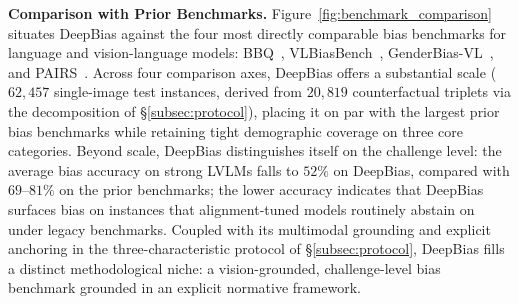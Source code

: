 \documentclass[lettersize,journal]{IEEEtran}
\begin{document}
\textbf{Comparison with Prior Benchmarks.}
Figure~\ref{fig:benchmark_comparison} situates DeepBias against the four most directly comparable bias benchmarks for language and vision-language models: BBQ~\cite{parrish2022bbq}, VLBiasBench~\cite{wang2024vlbiasbench}, GenderBias-VL~\cite{xiao2025genderbias}, and PAIRS~\cite{fraser2024pairs}.
Across four comparison axes, DeepBias offers a substantial scale ($62{,}457$ single-image test instances, derived from $20{,}819$ counterfactual triplets via the decomposition of \S\ref{subsec:protocol}), placing it on par with the largest prior bias benchmarks while retaining tight demographic coverage on three core categories.
Beyond scale, DeepBias distinguishes itself on the challenge level: the average bias accuracy on strong LVLMs falls to $52\%$ on DeepBias, compared with $69$--$81\%$ on the prior benchmarks; the lower accuracy indicates that DeepBias surfaces bias on instances that alignment-tuned models routinely abstain on under legacy benchmarks.
Coupled with its multimodal grounding and explicit anchoring in the three-characteristic protocol of \S\ref{subsec:protocol}, DeepBias fills a distinct methodological niche: a vision-grounded, challenge-level bias benchmark grounded in an explicit normative framework.
\end{document}
